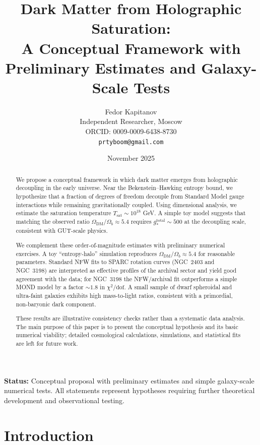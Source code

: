 \documentclass[11pt,a4paper]{article}
\title{\textbf{Dark Matter from Holographic Saturation:}\\[0.3em]
A Conceptual Framework with Preliminary Estimates and Galaxy-Scale Tests}
\author{Fedor Kapitanov\\[0.3em]
\small Independent Researcher, Moscow\\
\small ORCID: 0009-0009-6438-8730\\
\small \texttt{prtyboom@gmail.com}}
\date{November 2025}
\begin{document}
\maketitle

\begin{abstract}
We propose a conceptual framework in which dark matter emerges from holographic decoupling in the early universe. Near the Bekenstein--Hawking entropy bound, we hypothesize that a fraction of degrees of freedom decouple from Standard Model gauge interactions while remaining gravitationally coupled. Using dimensional analysis, we estimate the saturation temperature $T_{\mathrm{sat}} \sim 10^{18}$ GeV. A simple toy model suggests that matching the observed ratio $\Omega_{\mathrm{DM}}/\Omega_b \approx 5.4$ requires $g_*^{\mathrm{total}} \sim 500$ at the decoupling scale, consistent with GUT-scale physics.

We complement these order-of-magnitude estimates with preliminary numerical exercises. A toy ``entropy-halo'' simulation reproduces $\Omega_{\mathrm{DM}}/\Omega_b \approx 5.4$ for reasonable parameters. Standard NFW fits to SPARC rotation curves (NGC~2403 and NGC~3198) are interpreted as effective profiles of the archival sector and yield good agreement with the data; for NGC~3198 the NFW/archival fit outperforms a simple MOND model by a factor $\sim 1.8$ in $\chi^2/\mathrm{dof}$. A small sample of dwarf spheroidal and ultra-faint galaxies exhibits high mass-to-light ratios, consistent with a primordial, non-baryonic dark component.

These results are illustrative consistency checks rather than a systematic data analysis. The main purpose of this paper is to present the conceptual hypothesis and its basic numerical viability; detailed cosmological calculations, simulations, and statistical fits are left for future work.
\end{abstract}

\vspace{1em}
\noindent\textbf{Status:} Conceptual proposal with preliminary estimates and simple galaxy-scale numerical tests. All statements represent hypotheses requiring further theoretical development and observational testing.
\vspace{1em}

\tableofcontents

\section{Introduction}
\end{document}
